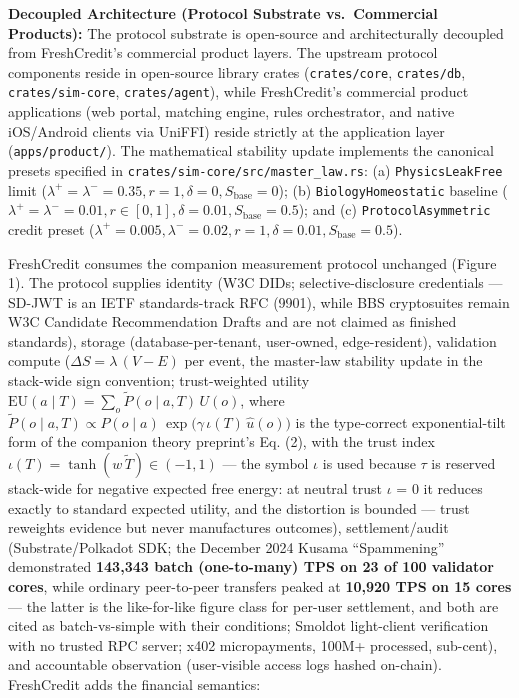 \documentclass[
]{article}
\begin{document}
\begin{enumerate}
  \textbf{Decoupled Architecture (Protocol Substrate vs.~Commercial
  Products):} The protocol substrate is open-source and architecturally
  decoupled from FreshCredit's commercial product layers. The upstream
  protocol components reside in open-source library crates
  (\texttt{crates/core}, \texttt{crates/db}, \texttt{crates/sim-core},
  \texttt{crates/agent}), while FreshCredit's commercial product
  applications (web portal, matching engine, rules orchestrator, and
  native iOS/Android clients via UniFFI) reside strictly at the
  application layer (\texttt{apps/product/}). The mathematical stability
  update implements the canonical presets specified in
  \texttt{crates/sim-core/src/master\_law.rs}: (a)
  \texttt{PhysicsLeakFree} limit
  (\(\lambda^+ = \lambda^- = 0.35, r=1, \delta=0, S_{\text{base}}=0\));
  (b) \texttt{BiologyHomeostatic} baseline
  (\(\lambda^+ = \lambda^- = 0.01, r \in [0, 1], \delta=0.01, S_{\text{base}}=0.5\));
  and (c) \texttt{ProtocolAsymmetric} credit preset
  (\(\lambda^+ = 0.005, \lambda^- = 0.02, r=1, \delta=0.01, S_{\text{base}}=0.5\)).
\end{enumerate}

FreshCredit consumes the companion measurement protocol unchanged
(Figure 1). The protocol supplies identity (W3C DIDs;
selective-disclosure credentials --- SD-JWT is an IETF standards-track
RFC (9901), while BBS cryptosuites remain W3C Candidate Recommendation
Drafts and are not claimed as finished standards), storage
(database-per-tenant, user-owned, edge-resident), validation compute
(\(\Delta S = \lambda\,(V - E)\) per event, the master-law stability
update in the stack-wide sign convention; trust-weighted utility
\(\mathrm{EU}(a \mid T) = \sum_o \tilde{P}(o \mid a, T)\,U(o)\), where
\(\tilde{P}(o \mid a, T) \propto P(o \mid a)\,\exp\!\big(\gamma\,\iota(T)\,\hat{u}(o)\big)\)
is the type-correct exponential-tilt form of the companion theory
preprint's Eq. (2), with the trust index
\(\iota(T) = \tanh(w\,\tilde{T}) \in (-1, 1)\) --- the symbol \(\iota\)
is used because \(\tau\) is reserved stack-wide for negative expected
free energy: at neutral trust \(\iota\) = 0 it reduces exactly to
standard expected utility, and the distortion is bounded --- trust
reweights evidence but never manufactures outcomes), settlement/audit
(Substrate/Polkadot SDK; the December 2024 Kusama ``Spammening''
demonstrated \textbf{143,343 batch (one-to-many) TPS on 23 of 100
validator cores}, while ordinary peer-to-peer transfers peaked at
\textbf{10,920 TPS on 15 cores} --- the latter is the like-for-like
figure class for per-user settlement, and both are cited as
batch-vs-simple with their conditions; Smoldot light-client verification
with no trusted RPC server; x402 micropayments, 100M+ processed,
sub-cent), and accountable observation (user-visible access logs hashed
on-chain). FreshCredit adds the financial semantics:
\end{document}

